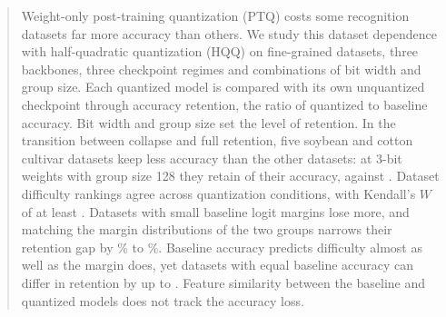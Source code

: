 \begin{abstract}
Weight-only post-training quantization (PTQ) costs some recognition datasets far more accuracy than others.
We study this dataset dependence with half-quadratic quantization (HQQ) on  fine-grained datasets, three backbones, three checkpoint regimes and  combinations of bit width and group size.
Each quantized model is compared with its own unquantized checkpoint through accuracy retention, the ratio of quantized to baseline accuracy.
Bit width and group size set the level of retention.
In the transition between collapse and full retention, five soybean and cotton cultivar datasets keep less accuracy than the other datasets: at 3-bit weights with group size 128 they retain  of their accuracy, against .
Dataset difficulty rankings agree across quantization conditions, with Kendall's $W$ of at least .
Datasets with small baseline logit margins lose more, and matching the margin distributions of the two groups narrows their retention gap by \% to \%.
Baseline accuracy predicts difficulty almost as well as the margin does, yet datasets with equal baseline accuracy can differ in retention by up to .
Feature similarity between the baseline and quantized models does not track the accuracy loss.
\end{abstract}
